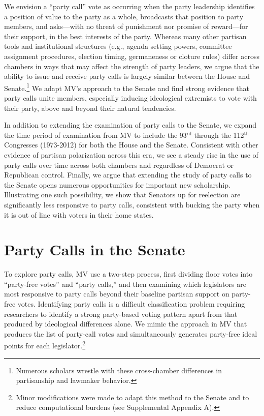 \documentclass[12pt]{article}
\begin{document}
We envision a ``party call'' vote as occurring when the party leadership
identifies a position of value to the party as a whole, broadcasts that position
to party members, and asks---with no threat of punishment nor promise of
reward---for their support, in the best interests of the party.
Whereas many other partisan tools and institutional structures (e.g., agenda
setting powers, committee assignment procedures, election timing, germaneness
or cloture rules) differ across chambers in ways that may affect the strength of
party leaders, we argue that the ability to issue and receive party calls is
largely similar between the House and Senate.\footnote{
  \doublespacing\normalsize
  Numerous scholars \citep[e.g.,][]{DenHartog:2011, Madonna:2011,
  Sinclair:2017, Smith:2007} wrestle with these cross-chamber differences in
  partisanship and lawmaker behavior.}
We adapt MV's approach to the Senate and find strong evidence that party
calls unite members, especially inducing ideological extremists to vote with
their party, above and beyond their natural tendencies.

In addition to extending the examination of party calls to the Senate, we
expand the time period of examination from MV to include the 93$^{\text{rd}}$
through the 112$^{\text{th}}$ Congresses (1973-2012) for both the House and the
Senate.
Consistent with other evidence of partisan polarization across this era, we see
a steady rise in the use of party calls over time across both chambers and
regardless of Democrat or Republican control.
Finally, we argue that extending the study of party calls to the Senate opens
numerous opportunities for important new scholarship.
Illustrating one such possibility, we show that Senators up for reelection are
significantly less responsive to party calls, consistent with bucking the party
when it is out of line with voters in their home states.


\section*{Party Calls in the Senate}


To explore party calls, MV use a two-step process, first dividing floor votes
into ``party-free votes'' and ``party calls,'' and then examining which
legislators are most responsive to party calls beyond their baseline partisan
support on party-free votes.
Identifying party calls is a difficult classification problem requiring
researchers to identify a strong party-based voting pattern apart from that
produced by ideological differences alone.
We mimic the approach in MV that produces the list of party-call votes and
simultaneously generates party-free ideal points for each legislator.\footnote{
  \doublespacing\normalsize
  Minor modifications were made to adapt this method to the Senate and to
  reduce computational burdens (see Supplemental Appendix A).}
\end{document}
